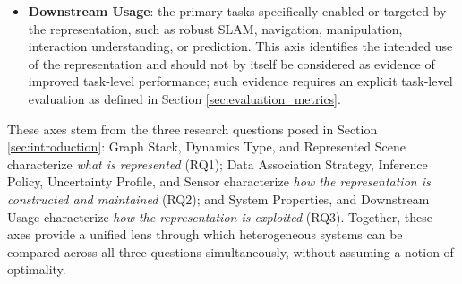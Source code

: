 \begin{itemize}
\begin{itemize}
        \item \textbf{OV}: \checkmark~ requires experimental operation beyond a fixed predefined semantic vocabulary; $\sim$ denotes use of open-vocabulary components without end-to-end evaluation; \xmark~ denotes no reported demonstration.
        \item \textbf{MR}: \checkmark~ requires an experimental demonstration in which multiple robots collaboratively construct, update, or use a shared representation; $\sim$ denotes architectural or component-level multi-robot support without end-to-end demonstration; \xmark~ denotes no reported demonstration.
    \end{itemize}
    \item \textbf{Downstream Usage}: the primary tasks specifically enabled or targeted by the representation, such as robust SLAM, navigation, manipulation, interaction understanding, or prediction. This axis identifies the intended use of the representation and should not by itself be considered as evidence of improved task-level performance; such evidence requires an explicit task-level evaluation as defined in Section \ref{sec:evaluation_metrics}. 
\end{itemize}
These axes stem from the three research questions posed in Section \ref{sec:introduction}: Graph Stack, Dynamics Type, and Represented Scene characterize \emph{what is represented} (RQ1); Data Association Strategy, Inference Policy, Uncertainty Profile, and Sensor  characterize \emph{how the representation is constructed and maintained} (RQ2); and System Properties, and Downstream Usage characterize \emph{how the representation is exploited} (RQ3). 
Together, these axes provide a unified lens through which heterogeneous systems can be compared across all three questions simultaneously, without assuming a notion of optimality.

